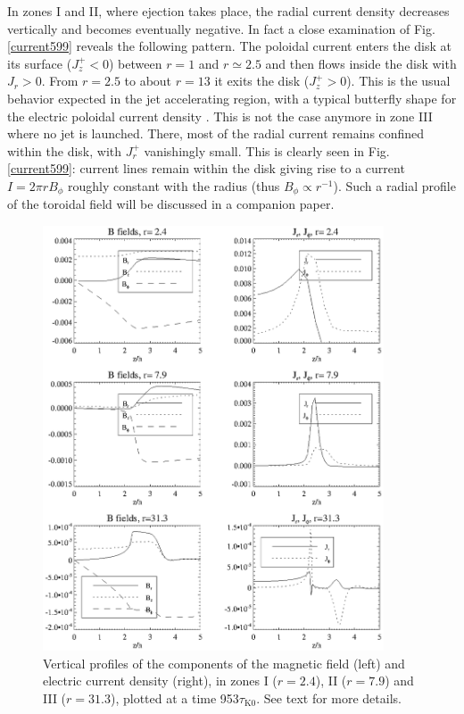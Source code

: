 \documentclass{aa}
\begin{document}
In zones I and II, where ejection takes place, the radial current density decreases vertically and becomes eventually negative. In fact a close examination of Fig. \ref{current599} reveals the
following pattern. The poloidal current enters the disk at its surface ($J_z^+<0$) between $r=1$ and $r\simeq2.5$ and then flows inside the disk with $J_r >0$. From $r=2.5$ to about $r=13$ it exits
the disk ($J_z^+ >0$). This is the usual behavior expected in the jet accelerating region, with a typical butterfly shape for the electric poloidal current density \citep[see Fig. 13 in][]{1997A&A...319..340F}. 
This is not the case anymore in zone III where no jet is launched. There, most of the radial current remains confined within the disk, with $J_r^+$ vanishingly small.
This is clearly seen in Fig. \ref{current599}: current lines remain within the disk giving rise to a current $I= 2 \pi r B_\phi$ roughly constant with the radius (thus $B_\phi \propto r^{-1}$). Such
a radial profile of the toroidal field will be discussed in a companion paper.


\begin{figure}
   \centering \includegraphics[width=0.9\textwidth]{12633f08.eps}
   \caption{Vertical profiles of the components of the magnetic field (left) and electric current density (right), in zones I ($r=2.4$), II ($r=7.9$) and III ($r=31.3$), plotted at a time
   953$\tau_\mathrm{K0}$. See text for more details.}
   \label{jandb123}%
\end{figure}
\end{document}
